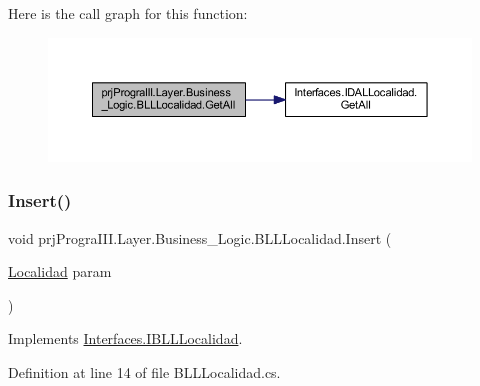 Here is the call graph for this function\+:
\nopagebreak
\begin{figure}[H]
\begin{center}
\leavevmode
\includegraphics[width=350pt]{classprj_progra_i_i_i_1_1_layer_1_1_business___logic_1_1_b_l_l_localidad_a0d66ff6caddf671534b300fb5ce2c3df_cgraph}
\end{center}
\end{figure}
\hypertarget{classprj_progra_i_i_i_1_1_layer_1_1_business___logic_1_1_b_l_l_localidad_a4c0ae52352d4acd717e66a511e667350}{}\label{classprj_progra_i_i_i_1_1_layer_1_1_business___logic_1_1_b_l_l_localidad_a4c0ae52352d4acd717e66a511e667350} 
\subsubsection{\texorpdfstring{Insert()}{Insert()}}
{\footnotesize\ttfamily void prj\+Progra\+I\+I\+I.\+Layer.\+Business\+\_\+\+Logic.\+B\+L\+L\+Localidad.\+Insert (\begin{DoxyParamCaption}\item[{\hyperlink{classprj_progra_i_i_i_1_1_layer_1_1_entities_1_1_localidad}{Localidad}}]{param }\end{DoxyParamCaption})}



Implements \hyperlink{interface_interfaces_1_1_i_b_l_l_localidad_a7bd5604308ad6d5a277cc70207125274}{Interfaces.\+I\+B\+L\+L\+Localidad}.



Definition at line 14 of file B\+L\+L\+Localidad.\+cs.

